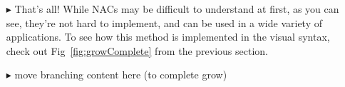\begin{itemize}
\vspace{0.5cm}

\item[$\blacktriangleright$] That's all! While NACs may be difficult to understand at first, as you can see, they're not hard to implement, and
can be used in a wide variety of applications. To see how this method is implemented in the visual syntax, check out Fig~\ref{fig:growComplete} from the previous
section.

\item[$\blacktriangleright$] \update	move branching content here (to complete grow)

\end{itemize}